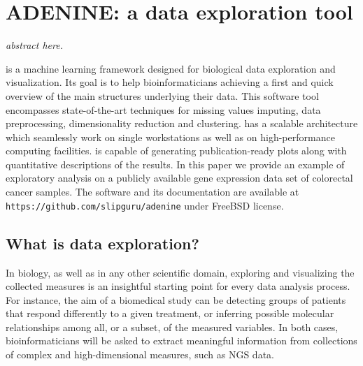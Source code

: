 
\chapter{ADENINE: a data exploration tool} \label{chap:adenine}

\begin{displayquote}
	\textit{abstract here.}
\end{displayquote}


\ade is a machine learning framework designed for biological data exploration and visualization.
Its goal is to help bioinformaticians achieving a first and quick overview of the main structures underlying their data.
This software tool encompasses state-of-the-art techniques for missing values imputing, data preprocessing, dimensionality reduction and clustering.
\ade has a scalable architecture which seamlessly work on single workstations as well as on high-performance computing facilities.
\ade is capable of generating publication-ready plots along with quantitative descriptions of the results.
In this paper we provide an example of exploratory analysis on a publicly available gene expression data set of colorectal cancer samples.
The software and its documentation are available at  {\footnotesize \texttt{https://github.com/slipguru/adenine}} under FreeBSD license.

\section{What is data exploration?} \label{sec:data_exploration}

In biology, as well as in any other scientific domain, exploring and visualizing the collected measures is an insightful starting point for every data analysis process.
For instance, the aim of a biomedical study can be detecting groups of patients that respond differently to a given treatment, or inferring possible molecular relationships among all, or a subset, of the measured variables.
In both cases, bioinformaticians will be asked to extract meaningful information from collections of complex and high-dimensional measures, such as \ac{NGS} data.

